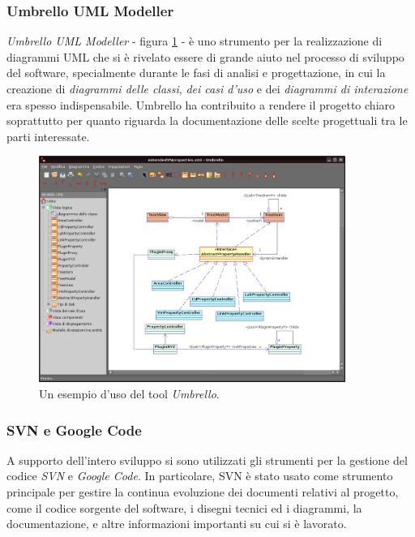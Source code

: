 \subsubsection{Umbrello UML Modeller}
\textit{Umbrello UML Modeller} - figura \ref{figura:umbrello_example} - è uno strumento per la realizzazione di diagrammi UML che si è rivelato essere di grande aiuto nel processo di sviluppo del software, specialmente durante le fasi di analisi e progettazione, in cui la creazione di \textit{diagrammi delle classi}, \textit{dei casi d'uso} e dei \textit{diagrammi di interazione} era spesso indispensabile. Umbrello ha contribuito a rendere il progetto chiaro soprattutto per quanto riguarda la documentazione delle scelte progettuali tra le parti interessate.

\begin{figure}[!htb]
	\centering
	\includegraphics[width=10cm]{images/umbrello.png}
	\caption{Un esempio d'uso del tool \emph{Umbrello}.}
	\label{figura:umbrello_example}
\end{figure}

\subsubsection{SVN e Google Code}
A supporto dell'intero sviluppo si sono utilizzati gli strumenti per la gestione del codice \textit{SVN} e \textit{Google Code}.
In particolare, SVN è stato usato come strumento principale per gestire la continua evoluzione dei documenti relativi al progetto, come il codice sorgente del software, i disegni tecnici ed i diagrammi, la documentazione, e altre informazioni importanti su cui si è lavorato.

